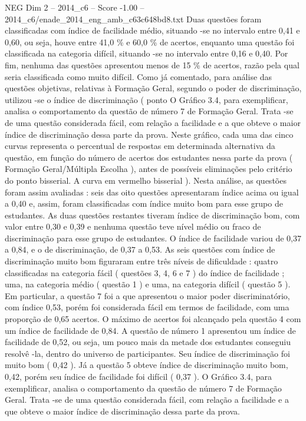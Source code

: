 \begin{textsample}{NEG Dim 2 – 2014\_c6 – Score -1.00 – 2014\_c6/enade\_2014\_eng\_amb\_c63c648bd8.txt}
Duas questões foram classificadas com índice de facilidade médio, situando -se no intervalo entre 0,41 e 0,60, ou seja, houve entre 41,0 \% e 60,0 \% de acertos, enquanto uma questão foi classificada na categoria difícil, situando -se no intervalo entre 0,16 e 0,40.
Por fim, nenhuma das questões apresentou menos de 15 \% de acertos, razão pela qual seria classificada como muito difícil.
Como já comentado, para análise das questões objetivas, relativas à Formação Geral, segundo o poder de discriminação, utilizou -se o índice de discriminação ( ponto O Gráfico 3.4, para exemplificar, analisa o comportamento da questão de número 7 de Formação Geral.
Trata -se de uma questão considerada fácil, com relação a facilidade e a que obteve o maior índice de discriminação dessa parte da prova.
Neste gráfico, cada uma das cinco curvas representa o percentual de respostas em determinada alternativa da questão, em função do número de acertos dos estudantes nessa parte da prova ( Formação Geral/Múltipla Escolha ), antes de possíveis eliminações pelo critério do ponto bisserial.
A curva em vermelho bisserial ).
Nesta análise, as questões foram assim avaliadas : seis das oito questões apresentaram índice acima ou igual a 0,40 e, assim, foram classificadas com índice muito bom para esse grupo de estudantes.
As duas questões restantes tiveram índice de discriminação bom, com valor entre 0,30 e 0,39 e nenhuma questão teve nível médio ou fraco de discriminação para esse grupo de estudantes.
O índice de facilidade variou de 0,37 a 0,84, e o de discriminação, de 0,37 a 0,53.
As seis questões com índice de discriminação muito bom figuraram entre três níveis de dificuldade : quatro classificadas na categoria fácil ( questões 3, 4, 6 e 7 ) do índice de facilidade ; uma, na categoria médio ( questão 1 ) e uma, na categoria difícil ( questão 5 ).
Em particular, a questão 7 foi a que apresentou o maior poder discriminatório, com índice 0,53, porém foi considerada fácil em termos de facilidade, com uma proporção de 0,65 acertos.
O máximo de acertos foi alcançado pela questão 4 com um índice de facilidade de 0,84.
A questão de número 1 apresentou um índice de facilidade de 0,52, ou seja, um pouco mais da metade dos estudantes conseguiu resolvê -la, dentro do universo de participantes.
Seu índice de discriminação foi muito bom ( 0,42 ).
Já a questão 5 obteve índice de discriminação muito bom, 0,42, porém seu índice de facilidade foi difícil ( 0,37 ).
O Gráfico 3.4, para exemplificar, analisa o comportamento da questão de número 7 de Formação Geral.
Trata -se de uma questão considerada fácil, com relação a facilidade e a que obteve o maior índice de discriminação dessa parte da prova.

\end{textsample}
